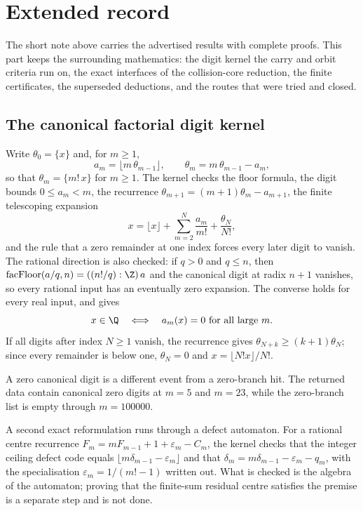 
\section{Extended record}\label{long68:sec:extended-record}

The short note above carries the advertised results with complete proofs.
This part keeps the surrounding mathematics: the digit kernel the carry and
orbit criteria run on, the exact interfaces of the collision-core reduction,
the finite certificates, the superseded deductions, and the routes that were
tried and closed.

\subsection{The canonical factorial digit kernel}\label{long68:sec:ext-digits}

Write $\theta_0=\{x\}$ and, for $m\ge1$,
\[
 a_m=\lfloor m\,\theta_{m-1}\rfloor,\qquad \theta_m=m\,\theta_{m-1}-a_m ,
\]
so that $\theta_m=\{m!\,x\}$ for $m\ge1$.  The kernel checks the floor
formula, the digit bounds $0\le a_m<m$, the recurrence
$\theta_{m+1}=(m+1)\theta_m-a_{m+1}$, the finite telescoping expansion
\[
 x=\lfloor x\rfloor+\sum_{m=2}^{N}\frac{a_m}{m!}+\frac{\theta_N}{N!},
\]
and the rule that a zero remainder at one index forces every later digit to
vanish.  The rational direction is also checked: if $q>0$ and $q\le n$, then
$\operatorname{facFloor}(a/q,n)=((n!/q):\Z)\,a$ and the canonical digit at
radix $n+1$ vanishes, so every rational input has an eventually zero
expansion.  The converse holds for every real input, and gives
\[
 x\in\Q\quad\Longleftrightarrow\quad a_m(x)=0\ \hbox{for all large }m .
\]
If all digits after index $N\ge1$ vanish, the recurrence gives
$\theta_{N+k}\ge(k+1)\theta_N$; since every remainder is below one,
$\theta_N=0$ and $x=\lfloor N!x\rfloor/N!$.

A zero canonical digit is a different event from a zero-branch hit.  The
returned data contain canonical zero digits at $m=5$ and $m=23$, while the
zero-branch list is empty through $m=100000$.

A second exact reformulation runs through a defect automaton.  For a rational
centre recurrence $F_m=mF_{m-1}+1+\varepsilon_m-C_m$, the kernel checks that
the integer ceiling defect code equals
$\lfloor m\delta_{m-1}-\varepsilon_m\rfloor$ and that
$\delta_m=m\delta_{m-1}-\varepsilon_m-q_m$, with the specialisation
$\varepsilon_m=1/(m!-1)$ written out.  What is checked is the algebra of the
automaton; proving that the finite-sum residual centre satisfies the premise
is a separate step and is not done.

